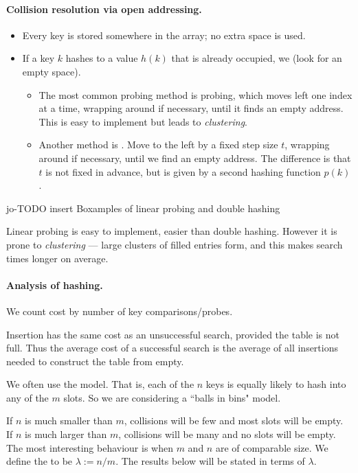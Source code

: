 \paragraph{Collision resolution via open addressing.}
\begin{itemize}
\item Every key is stored somewhere in the array; no extra space is used.
\item If a key  $k$ hashes to a value $h(k)$ that is already occupied, 
we  (look for an empty space). 
	\begin{itemize}
		\item The most common probing method is  probing, which moves left
		 one index at a time, wrapping around if necessary, until it finds an empty 
		 address. This is easy to implement but leads to \emph{clustering}.
		\item Another method is . Move to the left by a
		fixed step size $t$, wrapping around if necessary, until we find an
		empty address. The difference is that $t$ is not fixed in advance, but
		is given by a second hashing function $p(k)$.
	\end{itemize}
\end{itemize}

jo-TODO insert Boxamples of linear probing and double hashing 


Linear probing is easy to implement, easier than double hashing.
However it is prone to \emph{clustering} --- large clusters of filled entries form, and this makes search times longer on average.



\paragraph{Analysis of hashing.}

We count cost by number of key comparisons/probes.

Insertion has the same cost as an unsuccessful search, provided the table 
is not full. Thus the average cost of a successful search is the average of all insertions
 needed to construct the table from empty.

We often use the  model. That is, each of 
the $n$ keys is equally likely to hash into any of the $m$ slots. So we are 
considering a ``balls in bins" model.

If $n$ is much smaller than $m$, collisions will be few and most slots 
will be empty. If $n$ is much larger than $m$, collisions will be many and no 
slots will be empty. The most interesting behaviour is when $m$ and $n$ are 
of comparable size. We define the  to be $\lambda := n/m$. The results below 
will be stated in terms of $\lambda$.


